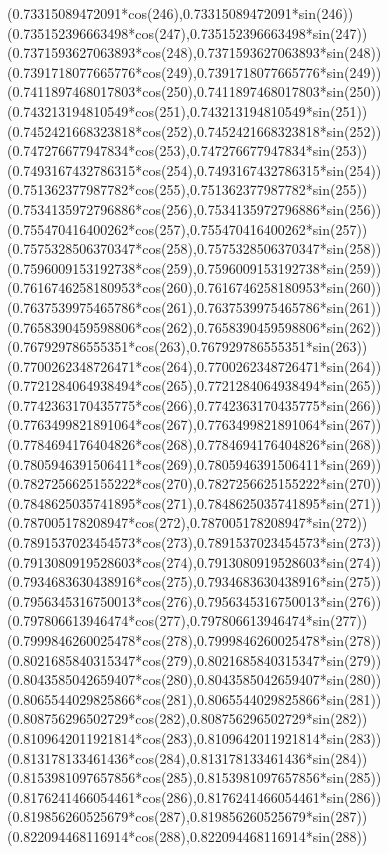 {({0.73315089472091*cos(246)},{0.73315089472091*sin(246)})
({0.735152396663498*cos(247)},{0.735152396663498*sin(247)})
({0.7371593627063893*cos(248)},{0.7371593627063893*sin(248)})
({0.7391718077665776*cos(249)},{0.7391718077665776*sin(249)})
({0.7411897468017803*cos(250)},{0.7411897468017803*sin(250)})
({0.743213194810549*cos(251)},{0.743213194810549*sin(251)})
({0.7452421668323818*cos(252)},{0.7452421668323818*sin(252)})
({0.747276677947834*cos(253)},{0.747276677947834*sin(253)})
({0.7493167432786315*cos(254)},{0.7493167432786315*sin(254)})
({0.751362377987782*cos(255)},{0.751362377987782*sin(255)})
({0.7534135972796886*cos(256)},{0.7534135972796886*sin(256)})
({0.755470416400262*cos(257)},{0.755470416400262*sin(257)})
({0.7575328506370347*cos(258)},{0.7575328506370347*sin(258)})
({0.7596009153192738*cos(259)},{0.7596009153192738*sin(259)})
({0.7616746258180953*cos(260)},{0.7616746258180953*sin(260)})
({0.7637539975465786*cos(261)},{0.7637539975465786*sin(261)})
({0.7658390459598806*cos(262)},{0.7658390459598806*sin(262)})
({0.767929786555351*cos(263)},{0.767929786555351*sin(263)})
({0.7700262348726471*cos(264)},{0.7700262348726471*sin(264)})
({0.7721284064938494*cos(265)},{0.7721284064938494*sin(265)})
({0.7742363170435775*cos(266)},{0.7742363170435775*sin(266)})
({0.7763499821891064*cos(267)},{0.7763499821891064*sin(267)})
({0.7784694176404826*cos(268)},{0.7784694176404826*sin(268)})
({0.7805946391506411*cos(269)},{0.7805946391506411*sin(269)})
({0.7827256625155222*cos(270)},{0.7827256625155222*sin(270)})
({0.7848625035741895*cos(271)},{0.7848625035741895*sin(271)})
({0.787005178208947*cos(272)},{0.787005178208947*sin(272)})
({0.7891537023454573*cos(273)},{0.7891537023454573*sin(273)})
({0.7913080919528603*cos(274)},{0.7913080919528603*sin(274)})
({0.7934683630438916*cos(275)},{0.7934683630438916*sin(275)})
({0.7956345316750013*cos(276)},{0.7956345316750013*sin(276)})
({0.797806613946474*cos(277)},{0.797806613946474*sin(277)})
({0.7999846260025478*cos(278)},{0.7999846260025478*sin(278)})
({0.8021685840315347*cos(279)},{0.8021685840315347*sin(279)})
({0.8043585042659407*cos(280)},{0.8043585042659407*sin(280)})
({0.8065544029825866*cos(281)},{0.8065544029825866*sin(281)})
({0.808756296502729*cos(282)},{0.808756296502729*sin(282)})
({0.8109642011921814*cos(283)},{0.8109642011921814*sin(283)})
({0.813178133461436*cos(284)},{0.813178133461436*sin(284)})
({0.8153981097657856*cos(285)},{0.8153981097657856*sin(285)})
({0.8176241466054461*cos(286)},{0.8176241466054461*sin(286)})
({0.819856260525679*cos(287)},{0.819856260525679*sin(287)})
({0.822094468116914*cos(288)},{0.822094468116914*sin(288)})
}
